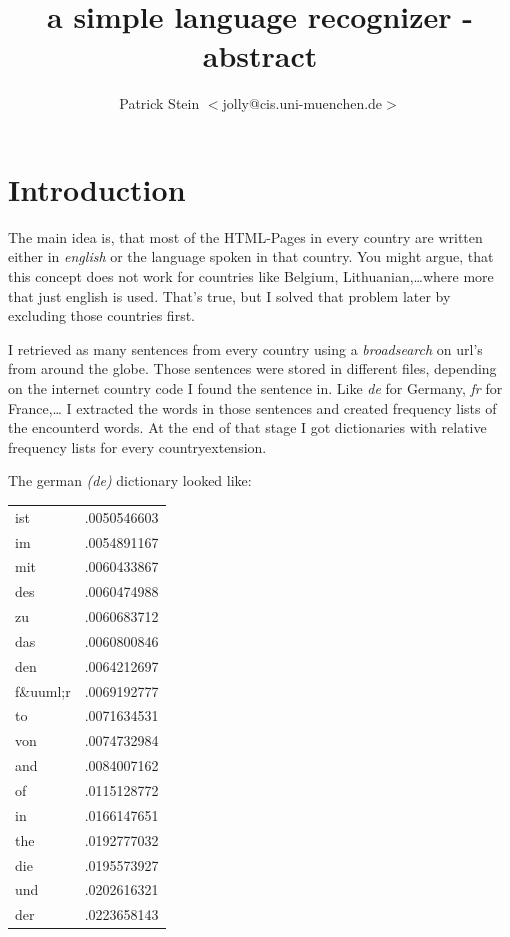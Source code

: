 \small
\newcommand{\nl}{{\newline}}

\title{a simple language recognizer - abstract}
\author{Patrick Stein $<$jolly@cis.uni-muenchen.de$>$ }

\maketitle
\small

\section{Introduction}
The main idea is, that most of the HTML-Pages in every country are written either in {\it english} or the language spoken in that country.
You might argue, that this concept does not work for countries like Belgium, Lithuanian,\dots where more that just english is used. That's true, but I solved that problem later by excluding those countries first.

I retrieved as many sentences from every country using a {\it broadsearch} on url's from around the globe. Those sentences were stored in different files, depending on the internet country code I found the sentence in. Like {\it de} for Germany, {\it fr} for France,\dots
I extracted the words in those sentences and created frequency lists of the encounterd words. At the end of that stage I got dictionaries with relative frequency lists for every countryextension.

The german {\it (de)} dictionary looked like:
\begin{center}
\begin{tabular}{lr}
ist	 	 &.0050546603 \\
im       &.0054891167 \\
mit      &.0060433867\\
des      &.0060474988 \\
zu       &.0060683712 \\
das      &.0060800846 \\
den      &.0064212697 \\
f\&uuml;r &.0069192777 \\
to       &.0071634531 \\
von      &.0074732984 \\
and      &.0084007162 \\
of       &.0115128772 \\
in       &.0166147651 \\
the      &.0192777032 \\
die      &.0195573927 \\
und      &.0202616321 \\
der      &.0223658143 \\
\end{tabular}
\end{center}

